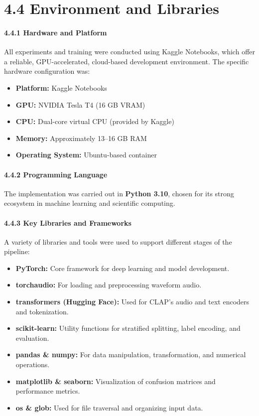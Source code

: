 \section*{4.4 Environment and Libraries}

\paragraph{4.4.1 Hardware and Platform\\}
All experiments and training were conducted using Kaggle Notebooks, which offer a reliable, GPU-accelerated, cloud-based development environment. The specific hardware configuration was:

\begin{itemize}
    \item \textbf{Platform:} Kaggle Notebooks
    \item \textbf{GPU:} NVIDIA Tesla T4 (16 GB VRAM)
    \item \textbf{CPU:} Dual-core virtual CPU (provided by Kaggle)
    \item \textbf{Memory:} Approximately 13–16 GB RAM
    \item \textbf{Operating System:} Ubuntu-based container
\end{itemize}

\paragraph{4.4.2 Programming Language\\}
The implementation was carried out in \textbf{Python 3.10}, chosen for its strong ecosystem in machine learning and scientific computing.

\paragraph{4.4.3 Key Libraries and Frameworks\\}
A variety of libraries and tools were used to support different stages of the pipeline:

\begin{itemize}
    \item \textbf{PyTorch:} Core framework for deep learning and model development.
    \item \textbf{torchaudio:} For loading and preprocessing waveform audio.
    \item \textbf{transformers (Hugging Face):} Used for CLAP’s audio and text encoders and tokenization.
    \item \textbf{scikit-learn:} Utility functions for stratified splitting, label encoding, and evaluation.
    \item \textbf{pandas \& numpy:} For data manipulation, transformation, and numerical operations.
    \item \textbf{matplotlib \& seaborn:} Visualization of confusion matrices and performance metrics.
    \item \textbf{os \& glob:} Used for file traversal and organizing input data.
\end{itemize}

